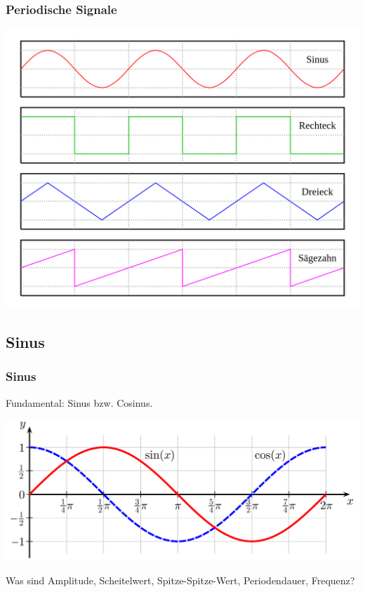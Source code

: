 \begin{frame}
    \frametitle{Periodische Signale}

    \begin{center}
        \includegraphics[width=1\textwidth]{a11/Waveforms_de.png}
        \tiny \hyperlink{refs}{\cite{wc}}
    \end{center}

\end{frame}

\subsection{Sinus}

\begin{frame}
    \frametitle{Sinus}

    Fundamental: Sinus bzw. Cosinus.

    \begin{center}
        \includegraphics[width=1\textwidth]{a11/Sine_cosine_one_period.png}
        \tiny \hyperlink{refs}{\cite{wc}}
    \end{center}

    Was sind Amplitude, Scheitelwert, Spitze-Spitze-Wert, Periodendauer, Frequenz?

\end{frame}


